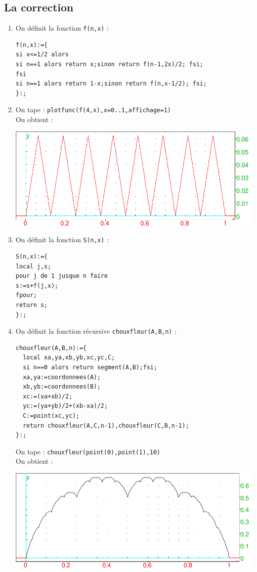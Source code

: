 \documentclass[a4paper,11pt]{book}
\begin{document}
\subsection{La correction}
\begin{enumerate}
\item On d\'efinit la fonction {\tt f(n,x)} :
\begin{verbatim}
f(n,x):={
si x<=1/2 alors
si n==1 alors return x;sinon return f(n-1,2x)/2; fsi;
fsi
si n==1 alors return 1-x;sinon return f(n,x-1/2); fsi;
}:;
\end{verbatim}
\item On tape :
{\tt plotfunc(f(4,x),x=0..1,affichage=1)}\\
On obtient :

\includegraphics[width=\textwidth]{chouchou}

\item On d\'efinit la fonction {\tt S(n,x)} :
\begin{verbatim}
S(n,x):={
local j,s;
pour j de 1 jusque n faire
s:=s+f(j,x);
fpour;
return s;
}:;
\end{verbatim}

\item On d\'efinit la fonction r\'ecursive {\tt chouxfleur(A,B,n)} :
\begin{verbatim}
chouxfleur(A,B,n):={
  local xa,ya,xb,yb,xc,yc,C;
  si n==0 alors return segment(A,B);fsi;
  xa,ya:=coordonnees(A);
  xb,yb:=coordonnees(B);
  xc:=(xa+xb)/2;
  yc:=(ya+yb)/2+(xb-xa)/2;
  C:=point(xc,yc);
  return chouxfleur(A,C,n-1),chouxfleur(C,B,n-1);
}:;
\end{verbatim}
 On tape :
{\tt chouxfleur(point(0),point(1),10)}\\
On obtient :

\includegraphics[width=\textwidth]{chouxfleur}
\end{enumerate}
\end{document}

